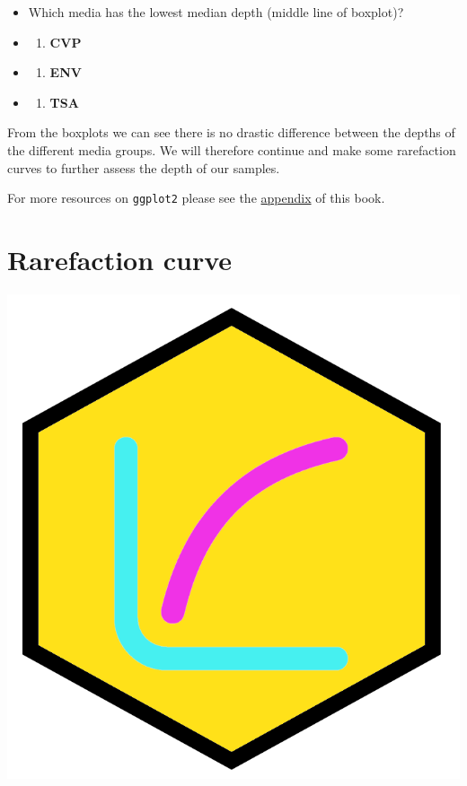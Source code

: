 \documentclass[
]{book}
\providecommand{\tightlist}{%
  \setlength{\itemsep}{0pt}\setlength{\parskip}{0pt}}
\begin{document}
\begin{itemize}
\item
  Which media has the lowest median depth (middle line of boxplot)?
\item
  \begin{enumerate}
  \def\labelenumi{(\Alph{enumi})}
  \tightlist
  \item
    \textbf{CVP}\\
  \end{enumerate}
\item
  \begin{enumerate}
  \def\labelenumi{(\Alph{enumi})}
  \setcounter{enumi}{1}
  \tightlist
  \item
    \textbf{ENV}\\
  \end{enumerate}
\item
  \begin{enumerate}
  \def\labelenumi{(\Alph{enumi})}
  \setcounter{enumi}{2}
  \tightlist
  \item
    \textbf{TSA}
  \end{enumerate}
\end{itemize}

From the boxplots we can see there is no drastic difference between the depths of the different media groups. We will therefore continue and make some rarefaction curves to further assess the depth of our samples.

For more resources on \texttt{ggplot2} please see the \protect\hyperlink{ggplot2_appendix}{appendix} of this book.

\hypertarget{chap9rarefaction}{%
\section{Rarefaction curve}\label{chap9rarefaction}}

\includegraphics{figures/rarefaction.png}
\end{document}
